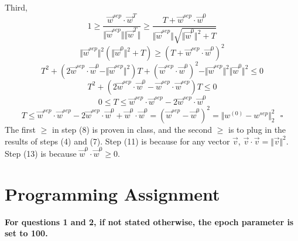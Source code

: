 \documentclass[paper=letter, fontsize=12pt]{article}
\begin{document}
\begin{enumerate}
Third,
\begin{equation}
1 \geq \frac{\vec{w}^{sep} \cdot \vec{w}^T}{\Vert \vec{w}^{sep} \Vert \Vert \vec{w}^{T} \Vert} \geq \frac{T + \vec{w}^{sep} \cdot \vec{w}^{0}}{\Vert \vec{w}^{sep} \Vert  \sqrt{\Vert \vec{w}^{0} \Vert^2 + T}}
\end{equation}
\begin{equation}
\Vert \vec{w}^{sep} \Vert^2 (\Vert \vec{w}^{0} \Vert^2 + T) \geq {(T + \vec{w}^{sep} \cdot \vec{w}^{0})}^2
\end{equation}
\begin{equation}
T^2 + (2 \vec{w}^{sep} \cdot \vec{w}^{0} - \Vert \vec{w}^{sep} \Vert^2)T + {(\vec{w}^{sep} \cdot \vec{w}^{0})}^2 - \Vert \vec{w}^{sep} \Vert^2 \Vert \vec{w}^{0} \Vert^2 \leq 0
\end{equation}
\begin{equation}
T^2 + (2 \vec{w}^{sep} \cdot \vec{w}^{0} - \vec{w}^{sep} \cdot \vec{w}^{sep})T \leq 0
\end{equation}
\begin{equation}
0 \leq T \leq \vec{w}^{sep} \cdot \vec{w}^{sep} - 2 \vec{w}^{sep} \cdot \vec{w}^{0}
\end{equation}
\begin{equation}
T \leq \vec{w}^{sep} \cdot \vec{w}^{sep} - 2 \vec{w}^{sep} \cdot \vec{w}^{0} + \vec{w}^0 \cdot \vec{w}^0 = (\vec{w}^{sep} - \vec{w}^0)^2 = \Vert w^{(0)} - w^{sep} \Vert^2_2 \ \ \ \square
\end{equation}
The first $\geq$ in step (8) is proven in class, and the second $\geq$ is to plug in the results of steps (4) and (7). Step (11) is because for any vector $\vec{v}$, $\vec{v} \cdot \vec{v} = \Vert \vec{v} \Vert^2$. Step (13) is because $\vec{w}^0 \cdot \vec{w}^0 \geq 0$.
\end{enumerate}

\section{Programming Assignment}

\textbf{For questions 1 and 2, if not stated otherwise, the epoch parameter is set to 100.}
\end{document}
